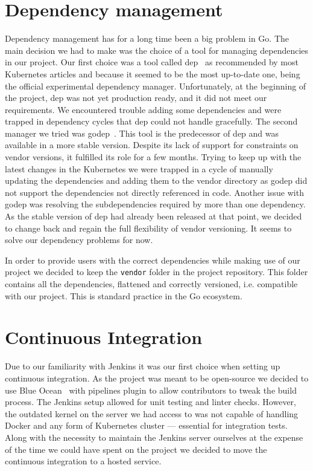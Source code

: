 \section{Dependency management}
Dependency management has for a long time been a big problem in Go. The main decision we had to make
was the choice of a tool for managing dependencies in our project. Our first choice was a tool called
dep~\cite{dep} as recommended by most Kubernetes articles and because it seemed to be the most up-to-date one,
being the official experimental dependency manager. Unfortunately, at the beginning of the project,
dep was not yet production ready, and it did not meet our requirements. We encountered trouble adding
some dependencies and were trapped in dependency cycles that dep could not handle gracefully. The
second manager we tried was godep~\cite{godep}. This tool is the predecessor of dep and was available in a more
stable version. Despite its lack of support for constraints on vendor versions, it fulfilled its
role for a few months. Trying to keep up with the latest changes in the Kubernetes we were trapped
in a cycle of manually updating the dependencies and adding them to the vendor directory as godep did not
support the dependencies not directly referenced in code. Another issue with godep was resolving the
subdependencies required by more than one dependency. As the stable version of dep had already been
released at that point, we decided to change back and regain the full flexibility of vendor
versioning. It seems to solve our dependency problems for now.

In order to provide users with the correct dependencies while making use of our project we decided
to keep the \texttt{vendor} folder in the project repository. This folder contains all the
dependencies, flattened and correctly versioned, i.e. compatible with our project. This is standard
practice in the Go ecosystem.

\section{Continuous Integration}
Due to our familiarity with Jenkins it was our first choice when setting up continuous integration.
As the project was meant to be open-source we decided to use Blue Ocean~\cite{blueocean} with pipelines plugin to
allow contributors to tweak the build process. The Jenkins setup allowed for unit testing and
linter checks. However, the outdated kernel on the server we had access to was not capable of handling
Docker and any form of Kubernetes cluster --- essential for integration tests. Along with the
necessity to maintain the Jenkins server ourselves at the expense of the time we could have spent
on the project we decided to move the continuous integration to a hosted service.


